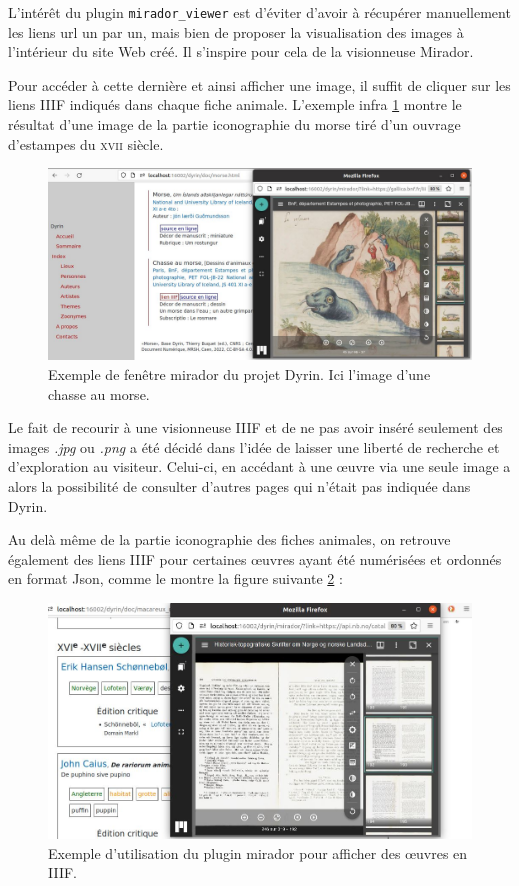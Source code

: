 \documentclass[a4paper,12pt,twoside]{book}
\begin{document}
L'intérêt du plugin \texttt{mirador\_viewer} est d'éviter d'avoir à récupérer manuellement les liens url un par un, mais bien de proposer la visualisation des images à l'intérieur du site Web créé. Il s'inspire pour cela de la visionneuse Mirador.




Pour accéder à cette dernière et ainsi afficher une image, il suffit de cliquer sur les liens \acrshort{IIIF} indiqués dans chaque fiche animale. L'exemple infra \ref{morse} montre le résultat d'une image de la partie iconographie du morse tiré d'un ouvrage d'estampes du \textsc{xvii}\ieme{} siècle.

\begin{figure}[H]
    \centering
    \includegraphics[width=13cm]{img/partie_3/morse.JPG}
    \caption{Exemple de fenêtre mirador du projet Dyrin. Ici l'image d'une chasse au morse.}
    \label{morse}
\end{figure}


Le fait de recourir à une visionneuse \acrshort{IIIF} et de ne pas avoir inséré seulement des images \textit{.jpg} ou \textit{.png} a été décidé dans l'idée de laisser une liberté de recherche et d'exploration au visiteur. Celui-ci, en accédant à une \oe{}uvre via une seule image a alors la possibilité de consulter d'autres pages qui n'était pas indiquée dans Dyrin.


Au delà même de la partie iconographie des fiches animales, on retrouve également des liens \acrshort{IIIF} pour certaines \oe{}uvres ayant été numérisées et ordonnés en format Json, comme le montre la figure suivante \ref{macareux_mirador} :

\begin{figure}[H]
    \centering
    \includegraphics[width=13cm]{img/partie_3/macareux_mirador.JPG}
    \caption{Exemple d'utilisation du plugin mirador pour afficher des \oe{}uvres en \acrshort{IIIF}.}
    \label{macareux_mirador}
\end{figure}
\end{document}
